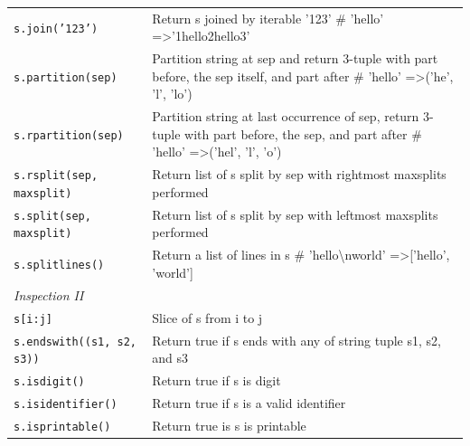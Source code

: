 \documentclass[a4paper,11pt]{book}
\begin{document}
\begin{appendices}
\begin{table}[!htbp]
\begin{tabular}{lp{11cm}}
\texttt{s.join('123')          }  & Return s joined by iterable '123' \# 'hello' =\textgreater '1hello2hello3'                                                                      \\
\texttt{s.partition(sep)        } & Partition string at sep and return 3-tuple with part before, the sep itself, and part after \# 'hello' =\textgreater ('he', 'l', 'lo')          \\
\texttt{s.rpartition(sep)      }  & Partition string at last occurrence of sep, return 3-tuple with part before, the sep, and part after \# 'hello' =\textgreater ('hel', 'l', 'o') \\
\texttt{s.rsplit(sep, maxsplit)}  & Return list of s split by sep with rightmost maxsplits performed                                                                                \\
\texttt{s.split(sep, maxsplit)}   & Return list of s split by sep with leftmost maxsplits performed                                                                                 \\
\texttt{s.splitlines()     }      & Return a list of lines in s \# 'hello\textbackslash{}nworld' =\textgreater {[}'hello', 'world'{]}                                               \\ \midrule
\textit{Inspection II}            &                                                                                                                                                 \\ \midrule
\texttt{s{[}i:j{]}        }       & Slice of s from i to j                                                                                                                          \\
\texttt{s.endswith((s1, s2, s3))} & Return true if s ends with any of string tuple s1, s2, and s3                                                                                   \\
\texttt{s.isdigit()           }   & Return true if s is digit                                                                                                                       \\
\texttt{s.isidentifier()      }   & Return true if s is a valid identifier                                                                                                          \\
\texttt{s.isprintable()      }    & Return true is s is printable                                                                                                                   \\ \midrule

\end{tabular}
\end{table}
\end{appendices}
\end{document}

